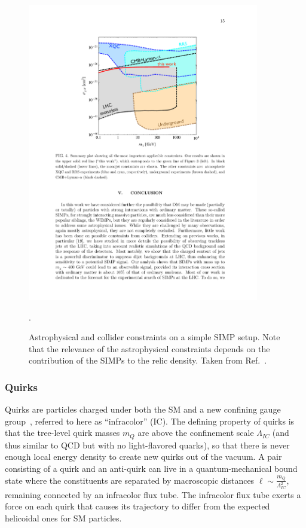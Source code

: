 \begin{figure}[t]
\centering
\includegraphics[width=0.9\textwidth]{plots/simps_constraints.pdf}
\caption{Astrophysical and collider constraints on a simple SIMP setup. Note that the relevance of the astrophysical constraints depends on the contribution of the SIMPs to the relic density. Taken from Ref.~\cite{Daci:2015hca}.}
  \label{fig:simps}.
\end{figure}

\subsubsection*{Quirks}

Quirks are particles charged under both the SM and a new confining gauge group~\cite{Kang:2008ea}, referred to here as ``infracolor'' (IC). The defining property of quirks is that the tree-level quirk masses $m_Q$ are above the confinement scale $\Lambda_{IC}$ (and thus similar to QCD but with no light-flavored quarks), so that there is never enough local energy density to create new quirks out of the vacuum. A pair consisting of a quirk and an anti-quirk can live in a quantum-mechanical bound state where the constituents are separated by macroscopic distances $\ell \sim \frac{m_Q}{\Lambda_{IC}^2}$, remaining connected by an infracolor flux tube. The infracolor flux tube exerts a force on each quirk that causes its trajectory to differ from the expected helicoidal ones for SM particles. 

